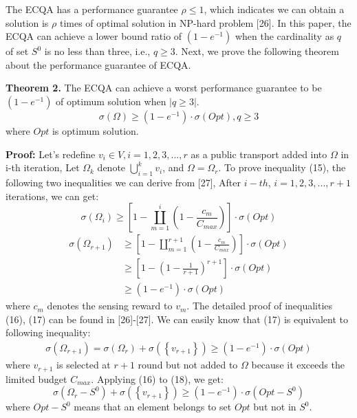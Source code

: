 \documentclass[journal]{IEEEtran}
\begin{document}
The ECQA has a performance guarantee $ \rho \leqslant 1$, which indicates we can obtain a solution is $\rho$ times of optimal solution in NP-hard problem [26]. In this paper, the ECQA can achieve a lower bound ratio of  $\left (1-e^{-1}  \right )$ when the cardinality as $q$ of set $S^{0}$ is no less than three, i.e.,  $q\geqslant 3$. Next, we prove the following theorem about the performance guarantee of ECQA.

\noindent
\textbf{Theorem 2.} The ECQA can achieve a worst performance guarantee to be  $\left (1-e^{-1}  \right )$ of optimum solution when $\left |q\geqslant 3 \right|$. 
\begin{equation}
\sigma (\Omega )\geqslant \left (1-e^{-1}  \right )\cdot \sigma (Opt), q\geqslant 3
\end{equation}
where $Opt$ is optimum solution.

\noindent
\textbf{Proof:} Let's redefine $v_{i}\in V,i=1,2,3,...,r$ as a public transport added into $\Omega$ in i-th iteration, Let $\Omega_{k}$ denote $ \bigcup_{i=1}^{k}v_{i}$, and $\Omega =\Omega _{r}$. To prove inequality (15), the following two inequalities we can derive from [27], After $i-th$, $ i=1,2,3,...,r+1$ iterations, we can get:
\begin{equation}
\sigma (\Omega _{i})\geqslant \left [ 1-\coprod_{m=1}^{i}(1-\frac{c_{m}}{C_{max}}) \right ]\cdot \sigma (Opt)
\end{equation}
\begin{equation}
\begin{aligned}
\sigma (\Omega _{r+1})&\geqslant \left [ 1-\coprod_{m=1}^{r+1}(1-\frac{c_{m}}{C_{max}}) \right ]\cdot \sigma (Opt) \\ & \geqslant \left [ 1-\left ( 1-\frac{1}{r+1} \right )^{r+1} \right ]\cdot\sigma (Opt)\\&\geqslant \left (1-e^{-1}  \right )\cdot\sigma (Opt) 
\end{aligned}
\end{equation}
where $c_{m}$ denotes the sensing reward to $v_{m}$. The detailed proof of inequalities (16), (17) can be found in [26]-[27]. We can easily know that (17) is equivalent to following inequality:
\begin{equation}
\begin{aligned}
\sigma (\Omega _{r+1})=\sigma(\Omega _{r})+\sigma(\left \{ v_{r+1}\right \})\geqslant\left ( 1-e^{-1} \right ) \cdot \sigma (Opt)
\end{aligned}
\end{equation}
where $v_{r+1}$ is selected at $r+1$ round but not added to $\Omega$ because it exceeds the limited budget $C_{max}$. Applying (16) to (18), we get:
\begin{equation}
\sigma (\Omega _{r}-S^{0})+\sigma (\left \{ v_{r+1} \right \})\geqslant \left ( 1-e^{-1} \right )\cdot \sigma (Opt-S^{0})
\end{equation}
where $Opt-S^{0}$ means that an element belongs to set $Opt$ but not in $S^{0}$.
\end{document}

